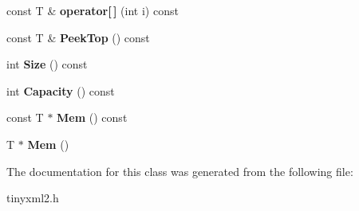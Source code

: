 \begin{DoxyCompactItemize}
\item 
\hypertarget{classtinyxml2_1_1_dyn_array_ac97d6ddabbcdb098f155e7fc11ea5d91}{}const T \& {\bfseries operator\mbox{[}$\,$\mbox{]}} (int i) const \label{classtinyxml2_1_1_dyn_array_ac97d6ddabbcdb098f155e7fc11ea5d91}

\item 
\hypertarget{classtinyxml2_1_1_dyn_array_a5658d49c056707f14b089b53c358eb11}{}const T \& {\bfseries Peek\+Top} () const \label{classtinyxml2_1_1_dyn_array_a5658d49c056707f14b089b53c358eb11}

\item 
\hypertarget{classtinyxml2_1_1_dyn_array_a5c3874dd4d5d0bf32919161b19ac7287}{}int {\bfseries Size} () const \label{classtinyxml2_1_1_dyn_array_a5c3874dd4d5d0bf32919161b19ac7287}

\item 
\hypertarget{classtinyxml2_1_1_dyn_array_a5ab6ef31e984e5cf78d0eb70ad3aec6d}{}int {\bfseries Capacity} () const \label{classtinyxml2_1_1_dyn_array_a5ab6ef31e984e5cf78d0eb70ad3aec6d}

\item 
\hypertarget{classtinyxml2_1_1_dyn_array_aef95a07fb624948d8ce3e638ab2e1f8b}{}const T $\ast$ {\bfseries Mem} () const \label{classtinyxml2_1_1_dyn_array_aef95a07fb624948d8ce3e638ab2e1f8b}

\item 
\hypertarget{classtinyxml2_1_1_dyn_array_a2f0842cd666e2ad951f1a8bd6561fa40}{}T $\ast$ {\bfseries Mem} ()\label{classtinyxml2_1_1_dyn_array_a2f0842cd666e2ad951f1a8bd6561fa40}

\end{DoxyCompactItemize}


The documentation for this class was generated from the following file\+:\begin{DoxyCompactItemize}
\item 
tinyxml2.\+h\end{DoxyCompactItemize}

